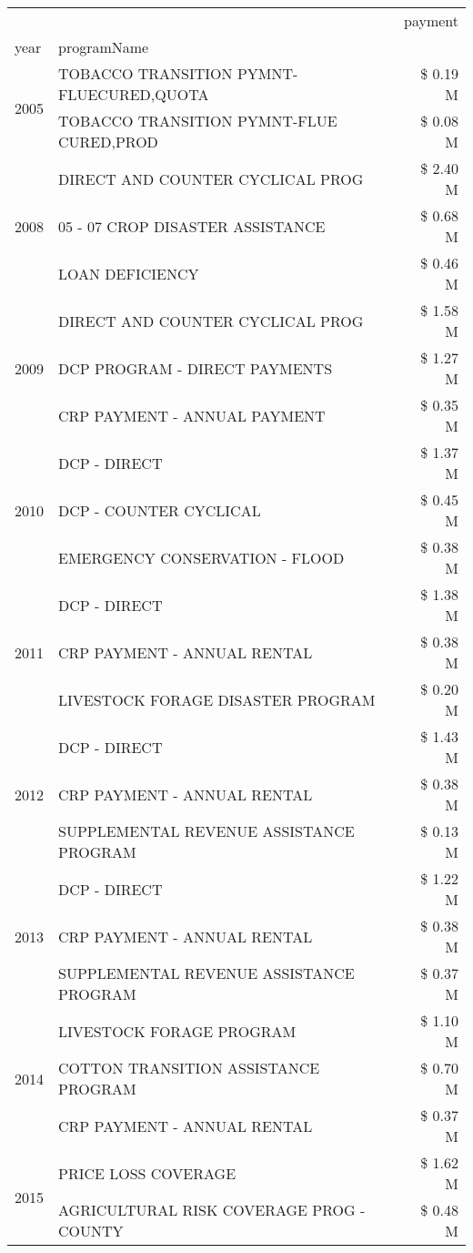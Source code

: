 \begin{tabular}{llr}
\toprule
 &  & payment \\
year & programName &  \\
\midrule
\multirow[t]{2}{*}{2005} & TOBACCO TRANSITION PYMNT-FLUECURED,QUOTA & \$ 0.19 M \\
 & TOBACCO TRANSITION PYMNT-FLUE CURED,PROD & \$ 0.08 M \\
\cline{1-3}
\multirow[t]{3}{*}{2008} & DIRECT AND COUNTER CYCLICAL PROG & \$ 2.40 M \\
 & 05 - 07 CROP DISASTER ASSISTANCE & \$ 0.68 M \\
 & LOAN DEFICIENCY & \$ 0.46 M \\
\cline{1-3}
\multirow[t]{3}{*}{2009} & DIRECT AND COUNTER CYCLICAL PROG & \$ 1.58 M \\
 & DCP PROGRAM - DIRECT PAYMENTS & \$ 1.27 M \\
 & CRP PAYMENT - ANNUAL PAYMENT & \$ 0.35 M \\
\cline{1-3}
\multirow[t]{3}{*}{2010} & DCP - DIRECT & \$ 1.37 M \\
 & DCP - COUNTER CYCLICAL & \$ 0.45 M \\
 & EMERGENCY CONSERVATION - FLOOD & \$ 0.38 M \\
\cline{1-3}
\multirow[t]{3}{*}{2011} & DCP - DIRECT & \$ 1.38 M \\
 & CRP PAYMENT - ANNUAL RENTAL & \$ 0.38 M \\
 & LIVESTOCK FORAGE DISASTER PROGRAM & \$ 0.20 M \\
\cline{1-3}
\multirow[t]{3}{*}{2012} & DCP - DIRECT & \$ 1.43 M \\
 & CRP PAYMENT - ANNUAL RENTAL & \$ 0.38 M \\
 & SUPPLEMENTAL REVENUE ASSISTANCE PROGRAM & \$ 0.13 M \\
\cline{1-3}
\multirow[t]{3}{*}{2013} & DCP - DIRECT & \$ 1.22 M \\
 & CRP PAYMENT - ANNUAL RENTAL & \$ 0.38 M \\
 & SUPPLEMENTAL REVENUE ASSISTANCE PROGRAM & \$ 0.37 M \\
\cline{1-3}
\multirow[t]{3}{*}{2014} & LIVESTOCK FORAGE PROGRAM & \$ 1.10 M \\
 & COTTON TRANSITION ASSISTANCE PROGRAM & \$ 0.70 M \\
 & CRP PAYMENT - ANNUAL RENTAL & \$ 0.37 M \\
\cline{1-3}
\multirow[t]{3}{*}{2015} & PRICE LOSS COVERAGE & \$ 1.62 M \\
 & AGRICULTURAL RISK COVERAGE PROG - COUNTY & \$ 0.48 M \\

\end{tabular}
